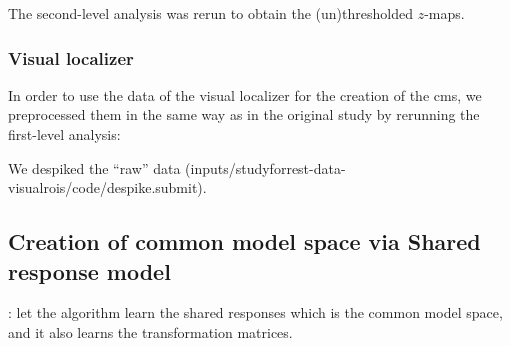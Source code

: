 The second-level analysis was rerun to obtain the (un)thresholded $z$-maps.


\subsubsection{Visual localizer}
In order to use the data of the visual localizer for the creation of the
\ac{cms}, we preprocessed them in the same way as in the original study
\citep{sengupta2016extension} by rerunning the first-level analysis:

We despiked the ``raw'' data
(inputs/studyforrest-data-visualrois/code/despike.submit).


\subsection{Creation of common model space via Shared response model}

\citep{chen2015reduced}: let the algorithm learn the shared responses which is
the common model space, and it also learns the transformation matrices.
%







